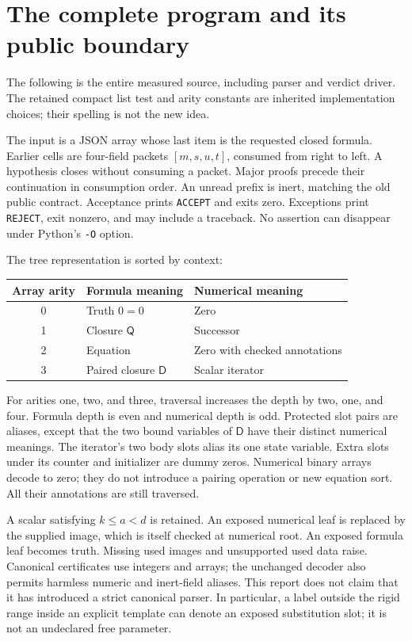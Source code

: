 \documentclass[11pt,letterpaper]{article}
\theoremstyle{definition}\newtheorem{definition}[theorem]{Definition}
\theoremstyle{remark}\newtheorem{remark}[theorem]{Remark}
\newcommand{\Q}{\mathsf Q}
\newcommand{\D}{\mathsf D}
\begin{document}
\section{The complete program and its public boundary}
\label{sec:program}

The following is the entire measured source, including parser and
verdict driver. The retained compact list test and arity constants are
inherited implementation choices; their spelling is not the new idea.


The input is a JSON array whose last item is the requested closed
formula. Earlier cells are four-field packets $[m,s,u,t]$, consumed
from right to left. A hypothesis closes without consuming a packet.
Major proofs precede their continuation in consumption order. An
unread prefix is inert, matching the old public contract. Acceptance
prints \texttt{ACCEPT} and exits zero. Exceptions print
\texttt{REJECT}, exit nonzero, and may include a traceback. No assertion
can disappear under Python's \texttt{-O} option.

The tree representation is sorted by context:
\begin{center}\small
\begin{tabular}{cll}
\toprule
Array arity & Formula meaning & Numerical meaning\\
\midrule
0 & Truth $0=0$ & Zero\\
1 & Closure $\Q$ & Successor\\
2 & Equation & Zero with checked annotations\\
3 & Paired closure $\D$ & Scalar iterator\\
\bottomrule
\end{tabular}
\end{center}
For arities one, two, and three, traversal increases the depth by
two, one, and four. Formula depth is even and numerical depth is
odd. Protected slot pairs are aliases, except that the two bound
variables of $\D$ have their distinct numerical meanings. The
iterator's two body slots alias its one state variable. Extra slots
under its counter and initializer are dummy zeros. Numerical
binary arrays decode to zero; they do not introduce a pairing
operation or new equation sort. All their annotations are still
traversed.

A scalar satisfying $k\le a<d$ is retained. An exposed numerical
leaf is replaced by the supplied image, which is itself checked at
numerical root. An exposed formula leaf becomes truth. Missing used
images and unsupported used data raise. Canonical certificates use
integers and arrays; the unchanged decoder also permits harmless
numeric and inert-field aliases. This report does not claim that it
has introduced a strict canonical parser. In particular, a label
outside the rigid range inside an explicit template can denote an
exposed substitution slot; it is not an undeclared free parameter.
\end{document}
